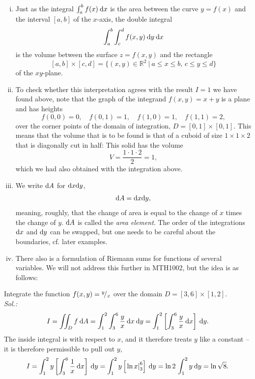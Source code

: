 \begin{remark}
\begin{enumerate}[(i)]
	\item Just as the integral $\int_{a}^{b} f(x) \: \mathrm{d} x$ is the area between the curve $y=f(x)$ and the interval $[a,b]$ of the $x$-axis, the double integral
	\[ \int_{a}^{b} \int_{c}^{d} f(x,y) \: \mathrm{d} y \: \mathrm{d} x \]
	is the volume between the surface $z=f(x,y)$ and the rectangle 
	\[ [a,b]\times[c,d] = 
		\{ (x,y)\in\mathbb{R}^2 \: | \: a \leq x \leq b,\, c \leq y \leq d \} \]
	of the $xy$-plane.
	\item To check whether this interpretation agrees with the result $I=1$ we have found above, note that the graph of the integrand $f(x,y)=x+y$ is a plane and has heights
	\[ f(0,0)=0, \quad f(0,1)=1, \quad f(1,0)=1, \quad f(1,1)=2, \]
	over the corner points of the domain of integration, $D=[0,1]\times[0,1]$. This means that the volume that is to be found is that of a cuboid of size $1 \times 1 \times 2$ that is diagonally cut in half:
	This solid has the volume
	\[ V = \frac{1\cdot1\cdot2}{2}=1, \]
	which we had also obtained with the integration above.
	\item We write $\mathrm{d} A$ for $\mathrm{d} x \mathrm{d} y$,
	\[ \mathrm{d} A = \mathrm{d} x \mathrm{d} y, \]
	meaning, roughly, that the change of area is equal to the change of $x$ times the change of $y$. $\mathrm{d} A$ is called the \emph{area element}. The order of the integrations $\mathrm{d} x$ and $\mathrm{d} y$ can be swapped, but one needs to be careful about the boundaries, cf. later examples.	
	\item There also is a formulation of Riemann sums for functions of several variables. We will not address this further in MTH1002, but the idea is as follows:
\end{enumerate}
\end{remark}

\begin{example}
Integrate the function $f(x,y)={}^{y}\!/_{x}$ over the domain $D=[3,6]\times[1,2]$. \\
{\it Sol.:}
\[ I = \iint_D f \: \mathrm{d} A 
= \int_{1}^{2} \int_{3}^{6} \frac{y}{x} \: \mathrm{d} x \: \mathrm{d} y
= \int_{1}^{2} \left[ \int_{3}^{6} \frac{y}{x} \: \mathrm{d} x\right] \: \mathrm{d} y. \]
The inside integral is with respect to $x$, and it therefore treats $y$ like a constant -- it is therefore permissible to pull out $y$,
\[ I = \int_{1}^{2} y \left[ \int_{3}^{6} \frac{1}{x} \: \mathrm{d} x\right] \: \mathrm{d} y
= \int_{1}^{2} y \left[ \left. \ln x \right|_3^6 \right] \: \mathrm{d} y 
= \ln 2 \, \int_{1}^{2} y \: \mathrm{d} y = \ln \sqrt{8}. \]
\end{example}

